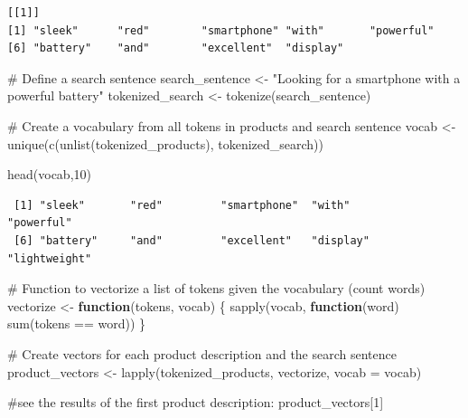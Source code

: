 \documentclass[
  letterpaper,
  DIV=11,
  numbers=noendperiod]{scrartcl}
\newenvironment{Shaded}{\begin{snugshade}}{\end{snugshade}}
\newcommand{\AttributeTok}[1]{\textcolor[rgb]{0.40,0.45,0.13}{#1}}
\newcommand{\CommentTok}[1]{\textcolor[rgb]{0.37,0.37,0.37}{#1}}
\newcommand{\ControlFlowTok}[1]{\textcolor[rgb]{0.00,0.23,0.31}{\textbf{#1}}}
\newcommand{\DecValTok}[1]{\textcolor[rgb]{0.68,0.00,0.00}{#1}}
\newcommand{\FunctionTok}[1]{\textcolor[rgb]{0.28,0.35,0.67}{#1}}
\newcommand{\NormalTok}[1]{\textcolor[rgb]{0.00,0.23,0.31}{#1}}
\newcommand{\OtherTok}[1]{\textcolor[rgb]{0.00,0.23,0.31}{#1}}
\newcommand{\SpecialCharTok}[1]{\textcolor[rgb]{0.37,0.37,0.37}{#1}}
\newcommand{\StringTok}[1]{\textcolor[rgb]{0.13,0.47,0.30}{#1}}
\begin{document}
\begin{verbatim}
[[1]]
[1] "sleek"      "red"        "smartphone" "with"       "powerful"  
[6] "battery"    "and"        "excellent"  "display"   
\end{verbatim}

\begin{Shaded}
\begin{Highlighting}[]
\CommentTok{\# Define a search sentence}
\NormalTok{search\_sentence }\OtherTok{\textless{}{-}} \StringTok{"Looking for a smartphone with a powerful battery"}
\NormalTok{tokenized\_search }\OtherTok{\textless{}{-}} \FunctionTok{tokenize}\NormalTok{(search\_sentence)}

\CommentTok{\# Create a vocabulary from all tokens in products and search sentence}
\NormalTok{vocab }\OtherTok{\textless{}{-}} \FunctionTok{unique}\NormalTok{(}\FunctionTok{c}\NormalTok{(}\FunctionTok{unlist}\NormalTok{(tokenized\_products), tokenized\_search))}

\FunctionTok{head}\NormalTok{(vocab,}\DecValTok{10}\NormalTok{)}
\end{Highlighting}
\end{Shaded}

\begin{verbatim}
 [1] "sleek"       "red"         "smartphone"  "with"        "powerful"   
 [6] "battery"     "and"         "excellent"   "display"     "lightweight"
\end{verbatim}

\begin{Shaded}
\begin{Highlighting}[]
\CommentTok{\# Function to vectorize a list of tokens given the vocabulary (count words)}
\NormalTok{vectorize }\OtherTok{\textless{}{-}} \ControlFlowTok{function}\NormalTok{(tokens, vocab) \{}
  \FunctionTok{sapply}\NormalTok{(vocab, }\ControlFlowTok{function}\NormalTok{(word) }\FunctionTok{sum}\NormalTok{(tokens }\SpecialCharTok{==}\NormalTok{ word))}
\NormalTok{\}}

\CommentTok{\# Create vectors for each product description and the search sentence}
\NormalTok{product\_vectors }\OtherTok{\textless{}{-}} \FunctionTok{lapply}\NormalTok{(tokenized\_products, vectorize, }\AttributeTok{vocab =}\NormalTok{ vocab)}

\CommentTok{\#see the results of the first product description:}
\NormalTok{product\_vectors[}\DecValTok{1}\NormalTok{]}
\end{Highlighting}
\end{Shaded}
\end{document}
